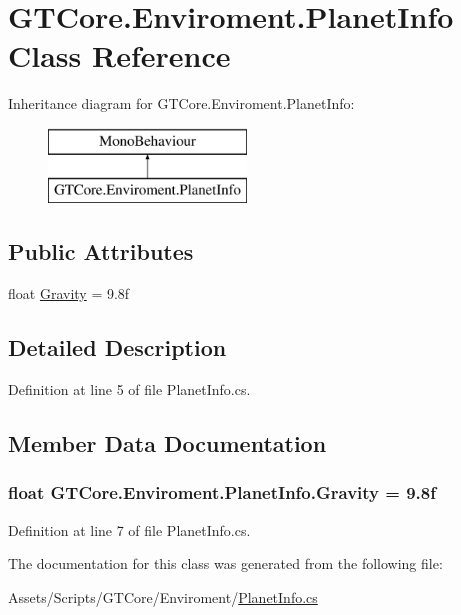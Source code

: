 \hypertarget{class_g_t_core_1_1_enviroment_1_1_planet_info}{}\section{G\+T\+Core.\+Enviroment.\+Planet\+Info Class Reference}
\label{class_g_t_core_1_1_enviroment_1_1_planet_info}
Inheritance diagram for G\+T\+Core.\+Enviroment.\+Planet\+Info\+:\begin{figure}[H]
\begin{center}
\leavevmode
\includegraphics[height=2.000000cm]{class_g_t_core_1_1_enviroment_1_1_planet_info}
\end{center}
\end{figure}
\subsection*{Public Attributes}
\begin{DoxyCompactItemize}
\item 
float \hyperlink{class_g_t_core_1_1_enviroment_1_1_planet_info_af0fdb445b6b3bd85dd6f3147f4cd0ebd}{Gravity} = 9.\+8f
\end{DoxyCompactItemize}


\subsection{Detailed Description}


Definition at line 5 of file Planet\+Info.\+cs.



\subsection{Member Data Documentation}
\hypertarget{class_g_t_core_1_1_enviroment_1_1_planet_info_af0fdb445b6b3bd85dd6f3147f4cd0ebd}{}
\subsubsection[{Gravity}]{\setlength{\rightskip}{0pt plus 5cm}float G\+T\+Core.\+Enviroment.\+Planet\+Info.\+Gravity = 9.\+8f}\label{class_g_t_core_1_1_enviroment_1_1_planet_info_af0fdb445b6b3bd85dd6f3147f4cd0ebd}


Definition at line 7 of file Planet\+Info.\+cs.



The documentation for this class was generated from the following file\+:\begin{DoxyCompactItemize}
\item 
Assets/\+Scripts/\+G\+T\+Core/\+Enviroment/\hyperlink{_planet_info_8cs}{Planet\+Info.\+cs}\end{DoxyCompactItemize}
